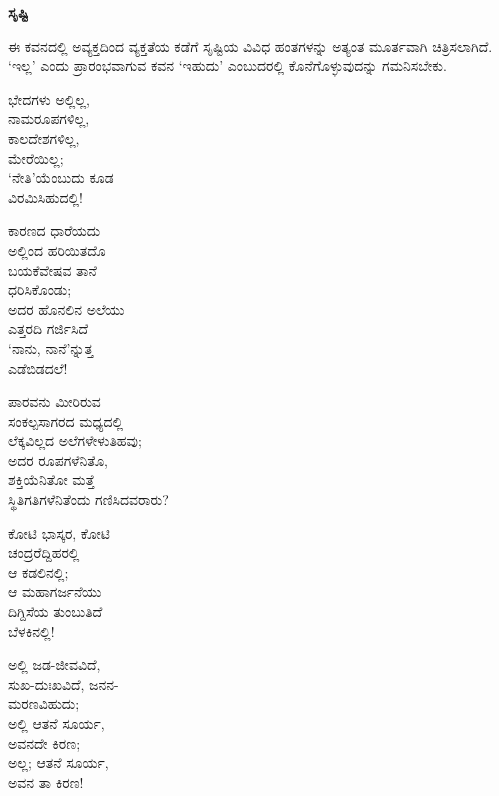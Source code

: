 
\begin{center}
\textbf{ಸೃಷ್ಟಿ}
\end{center}

ಈ ಕವನದಲ್ಲಿ ಅವ್ಯಕ್ತದಿಂದ ವ್ಯಕ್ತತೆಯ ಕಡೆಗೆ ಸೃಷ್ಟಿಯ ವಿವಿಧ ಹಂತಗಳನ್ನು ಅತ್ಯಂತ ಮೂರ್ತವಾಗಿ ಚಿತ್ರಿಸಲಾಗಿದೆ. ‘ಇಲ್ಲ’ ಎಂದು ಪ್ರಾರಂಭವಾಗುವ ಕವನ ‘ಇಹುದು’ ಎಂಬುದರಲ್ಲಿ ಕೊನೆಗೊಳ್ಳುವುದನ್ನು ಗಮನಿಸಬೇಕು.

\begin{myquote}
ಭೇದಗಳು ಅಲ್ಲಿಲ್ಲ,\\ನಾಮರೂಪಗಳಿಲ್ಲ,\\ಕಾಲದೇಶಗಳಿಲ್ಲ,\\ಮೇರೆಯಿಲ್ಲ;\\‘ನೇತಿ’ಯೆಂಬುದು ಕೂಡ\\ವಿರಮಿಸಿಹುದಲ್ಲಿ!
\end{myquote}

\begin{myquote}
ಕಾರಣದ ಧಾರೆಯದು\\ಅಲ್ಲಿಂದ ಹರಿಯಿತದೊ\\ಬಯಕೆವೇಷವ ತಾನೆ\\ಧರಿಸಿಕೊಂಡು;\\ಅದರ ಹೊನಲಿನ ಅಲೆಯು\\ಎತ್ತರದಿ ಗರ್ಜಿಸಿದೆ\\‘ನಾನು, ನಾನೆ’ನ್ನುತ್ತ\\ಎಡೆಬಿಡದಲೆ!
\end{myquote}

\begin{myquote}
ಪಾರವನು ಮೀರಿರುವ\\ಸಂಕಲ್ಪಸಾಗರದ ಮಧ್ಯದಲ್ಲಿ\\ಲೆಕ್ಕವಿಲ್ಲದ ಅಲೆಗಳೇಳುತಿಹವು;\\ಅದರ ರೂಪಗಳೆನಿತೊ,\\ಶಕ್ತಿಯೆನಿತೋ ಮತ್ತೆ\\ಸ್ಥಿತಿಗತಿಗಳೆನಿತೆಂದು ಗಣಿಸಿದವರಾರು?
\end{myquote}

\begin{myquote}
ಕೋಟಿ ಭಾಸ್ಕರ, ಕೋಟಿ\\ಚಂದ್ರರೆದ್ದಿಹರಲ್ಲಿ\\ಆ ಕಡಲಿನಲ್ಲಿ;\\ಆ ಮಹಾಗರ್ಜನೆಯು\\ದಿಗ್ದಿಸೆಯ ತುಂಬುತಿದೆ\\ಬೆಳಕಿನಲ್ಲಿ!
\end{myquote}

\begin{myquote}
ಅಲ್ಲಿ ಜಡ-ಜೀವವಿದೆ,\\ಸುಖ-ದುಃಖವಿದೆ, ಜನನ-\\ಮರಣವಿಹುದು;\\ಅಲ್ಲಿ ಆತನೆ ಸೂರ್ಯ,\\ಅವನದೇ ಕಿರಣ;\\ಅಲ್ಲ; ಆತನೆ ಸೂರ್ಯ,\\ಅವನ ತಾ ಕಿರಣ!
\end{myquote}

